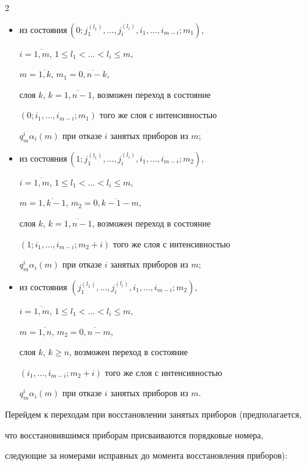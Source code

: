 \begin{multicols}{2}
\begin{itemize}


\item из состояния\,$\left (0;j_1^{(l_1)}\!,\ldots,j_i^{(l_i)},i_1,\ldots,i_{m-i};m_1\right )$,


$i=\overline{1,m}$, $1\le l_1<\ldots<l_i\le m$,


$m=\overline{1,k}$, $m_1=\overline{0,n-k}$,


слоя $k$, $k=\overline{1,n-1}$, возможен переход в состояние


$(0;i_1,\ldots,i_{m-i};m_1)$ того же слоя с интенсивностью


$q^i_m\alpha_i(m)$ при отказе $i$ занятых приборов из $m$;


\item


 из состояния\,$\left (1;j_1^{(l_1)}\!,\ldots,j_i^{(l_i)},i_1,\ldots,i_{m-i};m_2\right )$,


$i=\overline{1,m}$, $1\le l_1<\ldots<l_i\le m$, 


$m=\overline{1,k-1}$, $m_2=\overline{0,k-1-m}$,


слоя $k$, $k=\overline{1,n-1}$, возможен переход в состояние


$(1;i_1,\ldots,i_{m-i};m_2+i)$ того же слоя с интенсивностью


$q^i_m\alpha_i(m)$ при отказе $i$ занятых приборов из $m$;


\item


из состояния $\left (j_1^{(l_1)},\ldots,j_i^{(l_i)},i_1,\ldots,i_{m-i};m_2\right )$,


$i=\overline{1,m}$, $1\le l_1<\ldots<l_i\le m$,


$m=\overline{1,n}$, $m_2=\overline{0,n-m}$,


слоя $k$, $k\ge n$, возможен переход в состояние


$(i_1,\ldots,i_{m-i};m_2+i)$ того же слоя с интенсивностью


$q^i_m\alpha_i(m)$ при отказе $i$ занятых приборов из $m$.


\end{itemize}





Перейдем к переходам при восстановлении занятых приборов (предполагается,


что восстановившимся приборам присваиваются порядковые номера,


следующие за номерами исправных до момента восстановления приборов):



\end{multicols}
